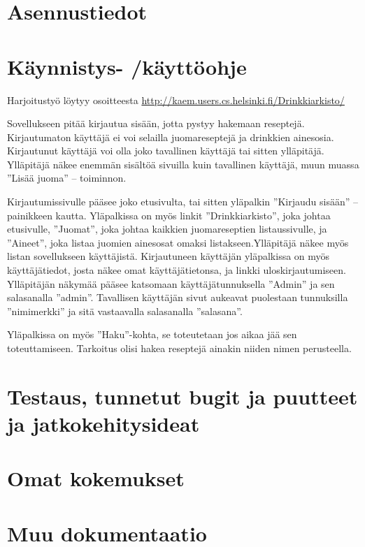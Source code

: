 \documentclass[a4paper]{article}
\begin{document}
\section{Asennustiedot}
\section{Käynnistys- /käyttöohje}
Harjoitustyö löytyy osoitteesta \url{http://kaem.users.cs.helsinki.fi/Drinkkiarkisto/}


Sovellukseen pitää kirjautua sisään, jotta pystyy hakemaan reseptejä. Kirjautumaton käyttäjä ei voi selailla juomareseptejä ja drinkkien ainesosia. Kirjautunut käyttäjä voi olla joko tavallinen käyttäjä tai sitten
ylläpitäjä. Ylläpitäjä näkee enemmän sisältöä sivuilla kuin tavallinen käyttäjä, muun muassa ”Lisää juoma” –
toiminnon.

Kirjautumissivulle pääsee joko etusivulta, tai sitten yläpalkin ”Kirjaudu sisään” – painikkeen
kautta. Yläpalkissa on myös linkit ”Drinkkiarkisto”, joka johtaa etusivulle, ”Juomat”, joka johtaa kaikkien
juomareseptien listaussivulle, ja ”Aineet”, joka listaa juomien ainesosat omaksi listakseen.Ylläpitäjä näkee myös listan sovellukseen käyttäjistä. Kirjautuneen käyttäjän yläpalkissa on myös käyttäjätiedot, josta näkee omat käyttäjätietonsa, ja linkki uloskirjautumiseen.
Ylläpitäjän näkymää pääsee katsomaan käyttäjätunnuksella ”Admin” ja sen salasanalla ”admin”. Tavallisen
käyttäjän sivut aukeavat puolestaan tunnuksilla ”nimimerkki” ja sitä vastaavalla salasanalla ”salasana”.

Yläpalkissa on myös ”Haku”-kohta, se toteutetaan jos aikaa jää sen toteuttamiseen. Tarkoitus olisi hakea reseptejä ainakin niiden nimen perusteella.

\section{Testaus, tunnetut bugit ja puutteet ja jatkokehitysideat}
\section{Omat kokemukset}
\section{Muu dokumentaatio}
\end{document}
